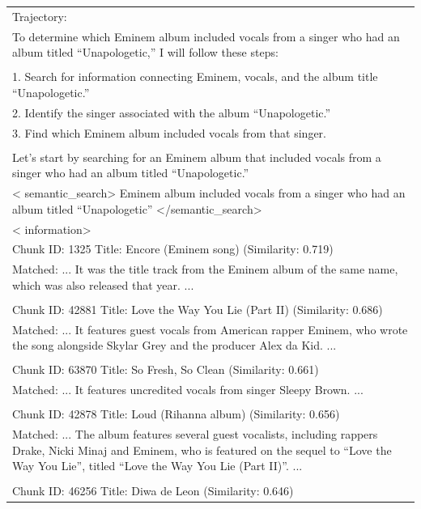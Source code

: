 \documentclass[11pt]{article}
\begin{document}
\begin{longtable}{|p{}|}
Trajectory: \\
To determine which Eminem album included vocals from a singer who had an album titled ``Unapologetic,'' I will follow these steps: \\
\\
1. Search for information connecting Eminem, vocals, and the album title ``Unapologetic.'' \\
2. Identify the singer associated with the album ``Unapologetic.'' \\
3. Find which Eminem album included vocals from that singer. \\
\\
Let's start by searching for an Eminem album that included vocals from a singer who had an album titled ``Unapologetic.'' \\
\hline
\textless{} semantic\_search\textgreater{} Eminem album included vocals from a singer who had an album titled ``Unapologetic'' \textless{}/semantic\_search\textgreater{} \\
\hline
\textless{} information\textgreater{} \\
Chunk ID: 1325 \textbar{} Title: Encore (Eminem song) (Similarity: 0.719) \\
Matched: ... It was the title track from the Eminem album of the same name, which was also released that year. ... \\
\\
Chunk ID: 42881 \textbar{} Title: Love the Way You Lie (Part II) (Similarity: 0.686) \\
Matched: ... It features guest vocals from American rapper Eminem, who wrote the song alongside Skylar Grey and the producer Alex da Kid. ... \\
\\
Chunk ID: 63870 \textbar{} Title: So Fresh, So Clean (Similarity: 0.661) \\
Matched: ... It features uncredited vocals from singer Sleepy Brown. ... \\
\\
Chunk ID: 42878 \textbar{} Title: Loud (Rihanna album) (Similarity: 0.656) \\
Matched: ... The album features several guest vocalists, including rappers Drake, Nicki Minaj and Eminem, who is featured on the sequel to ``Love the Way You Lie'', titled ``Love the Way You Lie (Part II)''. ... \\
\\
Chunk ID: 46256 \textbar{} Title: Diwa de Leon (Similarity: 0.646) \\

\end{longtable}
\end{document}
